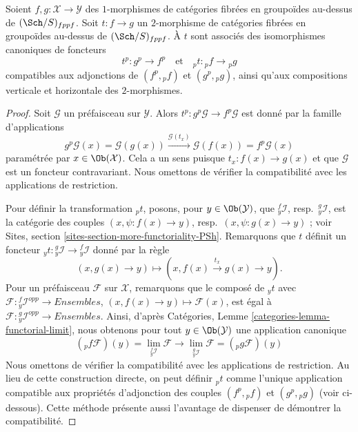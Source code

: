 \begin{lemma}
\label{lemma-2-morphisms-presheaves}
Soient $f, g : \mathcal{X} \to \mathcal{Y}$ des $1$-morphismes de catégories
fibrées en groupoïdes au-dessus de $(\Sch/S)_{fppf}$. Soit $t : f \to g$
un $2$-morphisme de catégories fibrées en groupoïdes au-dessus de
$(\Sch/S)_{fppf}$. À $t$ sont associés des
isomorphismes canoniques de foncteurs
$$
t^p : g^p \longrightarrow f^p
\quad\text{et}\quad
{}_pt : {}_pf \longrightarrow {}_pg
$$
compatibles aux adjonctions de $(f^p, {}_pf)$ et
$(g^p, {}_pg)$, ainsi qu'aux
compositions verticale et horizontale des $2$-morphismes.
\end{lemma}

\begin{proof}
Soit $\mathcal{G}$ un préfaisceau sur $\mathcal{Y}$. Alors
$t^p : g^p\mathcal{G} \to f^p\mathcal{G}$ est donné par la famille
d'applications
$$
g^p\mathcal{G}(x) = \mathcal{G}(g(x))
\xrightarrow{\mathcal{G}(t_x)}
\mathcal{G}(f(x)) = f^p\mathcal{G}(x)
$$
paramétrée par $x \in \Ob(\mathcal{X})$. Cela a un sens puisque
$t_x : f(x) \to g(x)$ et que $\mathcal{G}$ est un foncteur contravariant.
Nous omettons de vérifier la compatibilité avec les applications
de restriction.

\medskip\noindent
Pour définir la transformation ${}_pt$, posons, pour $y \in \Ob(\mathcal{Y})$,
que ${}_y^f\mathcal{I}$, resp.\ ${}_y^g\mathcal{I}$, est la catégorie
des couples $(x, \psi : f(x) \to y)$, resp.\ $(x, \psi : g(x) \to y)$ ; voir
Sites, section \ref{sites-section-more-functoriality-PSh}.
Remarquons que $t$ définit un foncteur
${}_yt : {}_y^g\mathcal{I} \to {}_y^f\mathcal{I}$
donné par la règle
$$
(x, g(x) \to y) \longmapsto (x, f(x) \xrightarrow{t_x} g(x) \to y).
$$
Pour un préfaisceau $\mathcal{F}$ sur $\mathcal{X}$, remarquons que le composé
de ${}_yt$ avec $\mathcal{F} : {}_y^f\mathcal{I}^{opp} \to \textit{Ensembles}$,
$(x, f(x) \to y) \mapsto \mathcal{F}(x)$, est égal à
$\mathcal{F} : {}_y^g\mathcal{I}^{opp} \to \textit{Ensembles}$. Ainsi, d'après
Catégories, Lemme \ref{categories-lemma-functorial-limit},
nous obtenons pour tout $y \in \Ob(\mathcal{Y})$ une application canonique
$$
({}_pf\mathcal{F})(y) = \lim_{{}_y^f\mathcal{I}} \mathcal{F}
\longrightarrow
\lim_{{}_y^g\mathcal{I}} \mathcal{F} = ({}_pg\mathcal{F})(y)
$$
Nous omettons de vérifier la compatibilité avec les applications
de restriction. Au lieu de cette construction directe, on peut définir
${}_pt$ comme l'unique application compatible aux propriétés d'adjonction
des couples $(f^p, {}_pf)$ et $(g^p, {}_pg)$ (voir ci-dessous). Cette méthode
présente aussi l'avantage de dispenser de démontrer la compatibilité.


\end{proof}
